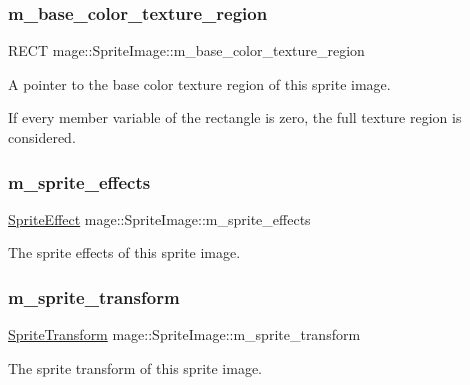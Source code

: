 \subsubsection{\texorpdfstring{m\+\_\+base\+\_\+color\+\_\+texture\+\_\+region}{m\_base\_color\_texture\_region}}
{\footnotesize\ttfamily R\+E\+CT mage\+::\+Sprite\+Image\+::m\+\_\+base\+\_\+color\+\_\+texture\+\_\+region\hspace{0.3cm}{\ttfamily [private]}}

A pointer to the base color texture region of this sprite image.

If every member variable of the rectangle is zero, the full texture region is considered. \hypertarget{classmage_1_1_sprite_image_acec094202967688a6e368eb44e5950ba}{}\label{classmage_1_1_sprite_image_acec094202967688a6e368eb44e5950ba} 
\subsubsection{\texorpdfstring{m\+\_\+sprite\+\_\+effects}{m\_sprite\_effects}}
{\footnotesize\ttfamily \hyperlink{namespacemage_ad62ebdf0e7aae0caf1535a4ea3f056ea}{Sprite\+Effect} mage\+::\+Sprite\+Image\+::m\+\_\+sprite\+\_\+effects\hspace{0.3cm}{\ttfamily [private]}}

The sprite effects of this sprite image. \hypertarget{classmage_1_1_sprite_image_aee2dc3f28e26692066fe791b71012929}{}\label{classmage_1_1_sprite_image_aee2dc3f28e26692066fe791b71012929} 
\subsubsection{\texorpdfstring{m\+\_\+sprite\+\_\+transform}{m\_sprite\_transform}}
{\footnotesize\ttfamily \hyperlink{classmage_1_1_sprite_transform}{Sprite\+Transform} mage\+::\+Sprite\+Image\+::m\+\_\+sprite\+\_\+transform\hspace{0.3cm}{\ttfamily [private]}}

The sprite transform of this sprite image. 